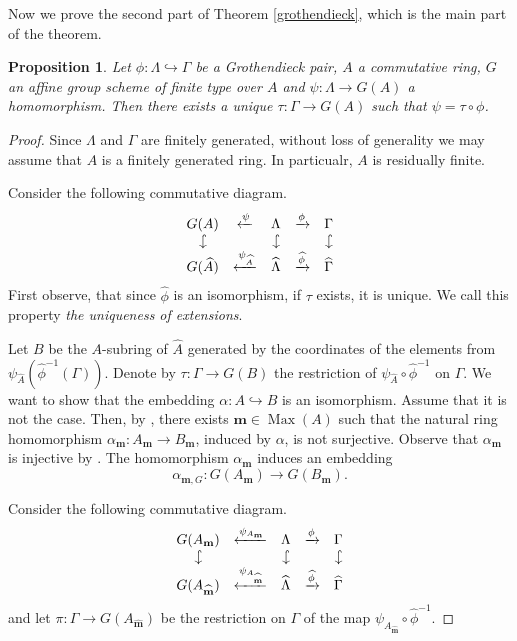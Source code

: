 \documentclass{amsart}
\newcommand{\hookdownarrow}{\mathrel{\rotatebox[origin=c]{-90}{$\hookrightarrow$}}}
\newtheorem{pro}[lem]{Proposition}
\theoremstyle{definition}
\theoremstyle{remark}
\DeclareMathOperator{\Max}{Max}
\begin{document}
 Now we prove the second part of Theorem \ref{grothendieck}, which is the main part of the theorem.
\begin{pro}\label{gr3}
Let $\phi:\Lambda \hookrightarrow \Gamma$ be a Grothendieck pair, $A$  a commutative ring,  $G$ an affine group scheme of finite type over $A$ and $\psi: \Lambda\to G(A)$ a homomorphism. Then there exists a unique $\tau:\Gamma \to  G(A) $ such that $\psi=\tau\circ\phi$.
\end{pro}
\begin{proof} Since $\Lambda$ and $\Gamma$ are finitely generated, without loss of generality we may assume that $A$ is a finitely generated ring. In particualr, $A$ is residually finite.


Consider the following commutative diagram.
\begin{equation}\label{diagram1}\begin{array}{ccccc}
G (A)&\xleftarrow{\psi} & \Lambda & \xrightarrow{\phi} &\Gamma \\
\hookdownarrow &&\hookdownarrow &&\hookdownarrow \\
G (\widehat A)&\xleftarrow{\psi_{\widehat{A}}} & \widehat{ \Lambda }& \xrightarrow{\widehat{\phi}} &\widehat{\Gamma}
 \end{array}\end{equation}
First observe, that since $\widehat{\phi}$ is an isomorphism,  if $\tau$ exists, it is unique. We call this property  {\it the uniqueness of extensions}.

Let $B$ be the $A$-subring of $\widehat A$ generated by the  coordinates  of the elements  
from ${\psi_{\widehat{A}}}(\widehat{\phi}^{-1}(\Gamma))$. Denote by $\tau:\Gamma\to G (B)$ the  restriction of $ \psi_{\widehat{A}}\circ \widehat{\phi}^{-1}$ on $\Gamma$.
We want to show that the embedding $\alpha:A\hookrightarrow B$ is an isomorphism. Assume that it is not the case. 
Then, by \cite[Proposition 3.9]{AMbook}, there exists $\mathbf m\in \Max(A)$ such that the natural ring homomorphism  $\alpha_{\mathbf m}:A_{\mathbf m}\to B_{\mathbf m}$, induced by   $\alpha$, is not surjective. Observe that $\alpha_{\mathbf m}$ is injective by \cite[Proposition 3.9]{AMbook}. The homomorphism $\alpha_{\mathbf m}$ induces an embedding
$$\alpha_{\mathbf m, G}:G(A_{\mathbf m})\to G(B_{ \mathbf m}).$$

Consider the following commutative diagram.
 \begin{equation}\label{diagram2}\begin{array}{ccccc}
G (A_{\mathbf m})&\xleftarrow{\psi_{A_{\mathbf m}}} & \Lambda & \xrightarrow{\phi} &\Gamma \\
\hookdownarrow &&\hookdownarrow &&\hookdownarrow \\
G (A_{\widehat{\mathbf m}})&\xleftarrow{{\psi_{A_{\widehat{\mathbf m}}}}} & \widehat{ \Lambda }& \xrightarrow{\widehat{\phi}} &\widehat{\Gamma}
 \end{array}\end{equation}
 and let $\pi:\Gamma\to G (A_{\widehat{\mathbf m}}) $ be the restriction on  $\Gamma$ of the map $ \psi_{A_{\widehat{\mathbf m}}}\circ\widehat{\phi}^{-1}$.
 

\end{proof}
\end{document}
